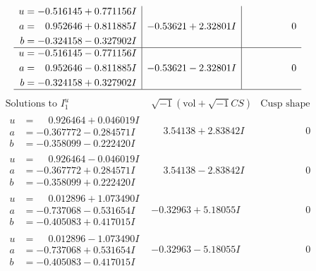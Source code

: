 \documentclass[1p]{elsarticle_modified}
\theoremstyle{definition}
\newcommand{\I}{\sqrt{-1}}
\begin{document}
$$\begin{array}{c|c|c}
\begin{aligned}
u &= -0.516145 + 0.771156 I \\
a &= \phantom{-}0.952646 + 0.811885 I \\
b &= -0.324158 - 0.327902 I\end{aligned}
 & -0.53621 + 2.32801 I & \phantom{-0.000000 } 0 \\ \hline\begin{aligned}
u &= -0.516145 - 0.771156 I \\
a &= \phantom{-}0.952646 - 0.811885 I \\
b &= -0.324158 + 0.327902 I\end{aligned}
 & -0.53621 - 2.32801 I & \phantom{-0.000000 } 0\\
 \hline 
 \end{array}$$\newpage$$\begin{array}{c|c|c}  
\text{Solutions to }I^u_{1}& \I (\text{vol} + \sqrt{-1}CS) & \text{Cusp shape}\\
 \hline 
\begin{aligned}
u &= \phantom{-}0.926464 + 0.046019 I \\
a &= -0.367772 - 0.284571 I \\
b &= -0.358099 - 0.222420 I\end{aligned}
 & \phantom{-}3.54138 + 2.83842 I & \phantom{-0.000000 } 0 \\ \hline\begin{aligned}
u &= \phantom{-}0.926464 - 0.046019 I \\
a &= -0.367772 + 0.284571 I \\
b &= -0.358099 + 0.222420 I\end{aligned}
 & \phantom{-}3.54138 - 2.83842 I & \phantom{-0.000000 } 0 \\ \hline\begin{aligned}
u &= \phantom{-}0.012896 + 1.073490 I \\
a &= -0.737068 - 0.531654 I \\
b &= -0.405083 + 0.417015 I\end{aligned}
 & -0.32963 + 5.18055 I & \phantom{-0.000000 } 0 \\ \hline\begin{aligned}
u &= \phantom{-}0.012896 - 1.073490 I \\
a &= -0.737068 + 0.531654 I \\
b &= -0.405083 - 0.417015 I\end{aligned}
 & -0.32963 - 5.18055 I & \phantom{-0.000000 } 0 \\ \hline\begin{aligned}

\end{aligned}
\end{array}$$
\end{document}
